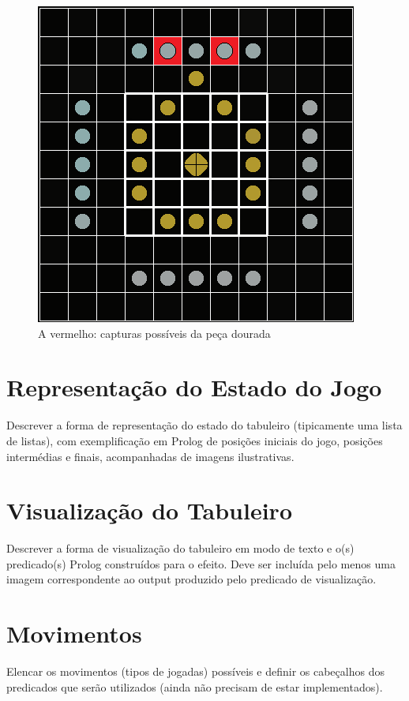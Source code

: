 \documentclass[a4paper]{article}
\begin{document}
\begin{figure}
\centering
\includegraphics[scale=1]{Breakthru_capture.png}
\caption{A vermelho: capturas possíveis da peça dourada}
\label{fig:moves}
\end{figure}



\section{Representação do Estado do Jogo}

Descrever a forma de representação do estado do tabuleiro (tipicamente uma lista de listas), com exemplificação em Prolog de posições iniciais do jogo, posições intermédias e finais, acompanhadas de imagens ilustrativas.


\section{Visualização do Tabuleiro}

Descrever a forma de visualização do tabuleiro em modo de texto e o(s) predicado(s) Prolog construídos para o efeito.
Deve ser incluída pelo menos uma imagem correspondente ao output produzido pelo predicado de visualização.


\section{Movimentos}

Elencar os movimentos (tipos de jogadas) possíveis e definir os cabeçalhos dos predicados que serão utilizados (ainda não precisam de estar implementados).
\end{document}

